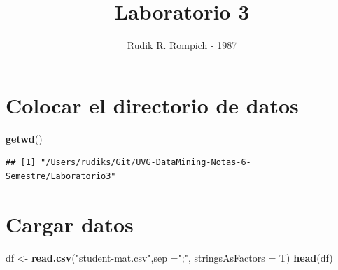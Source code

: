 \documentclass[
]{article}
\title{Laboratorio 3}
\author{Rudik R. Rompich - 1987}
\date{}
\newenvironment{Shaded}{\begin{snugshade}}{\end{snugshade}}
\newcommand{\DataTypeTok}[1]{\textcolor[rgb]{0.13,0.29,0.53}{#1}}
\newcommand{\KeywordTok}[1]{\textcolor[rgb]{0.13,0.29,0.53}{\textbf{#1}}}
\newcommand{\NormalTok}[1]{#1}
\newcommand{\StringTok}[1]{\textcolor[rgb]{0.31,0.60,0.02}{#1}}
\begin{document}
\maketitle

\hypertarget{colocar-el-directorio-de-datos}{%
\section{Colocar el directorio de
datos}\label{colocar-el-directorio-de-datos}}

\begin{Shaded}
\begin{Highlighting}[]
\KeywordTok{getwd}\NormalTok{()}
\end{Highlighting}
\end{Shaded}

\begin{verbatim}
## [1] "/Users/rudiks/Git/UVG-DataMining-Notas-6-Semestre/Laboratorio3"
\end{verbatim}

\hypertarget{cargar-datos}{%
\section{Cargar datos}\label{cargar-datos}}

\begin{Shaded}
\begin{Highlighting}[]
\NormalTok{df <-}\StringTok{ }\KeywordTok{read.csv}\NormalTok{(}\StringTok{"student-mat.csv"}\NormalTok{,}\DataTypeTok{sep =}\StringTok{";"}\NormalTok{, }\DataTypeTok{stringsAsFactors =}\NormalTok{  T)}
\KeywordTok{head}\NormalTok{(df)}
\end{Highlighting}
\end{Shaded}
\end{document}
